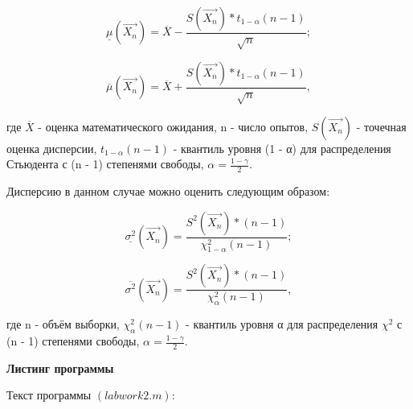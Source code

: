 \documentclass[12pt,a4paper]{scrartcl}
\begin{document}
\begin{equation}\label{eq1.1}
\underline {μ} (\overrightarrow {X_n}) = \overline {X} - \frac {S(\overrightarrow {X_n}) * t_{1-α} (n - 1)} {\sqrt {n}};
\end{equation}

\begin{equation}\label{eq1.2}
\overline {μ} (\overrightarrow {X_n}) = \overline {X} + \frac {S(\overrightarrow {X_n}) * t_{1-α} (n - 1)} {\sqrt {n}},
\end{equation}

где $\overline {X}$ - оценка математического ожидания, n - число опытов, $S(\overrightarrow {X_n})$ - точечная оценка дисперсии, $t_{1-α} (n - 1)$ - квантиль уровня (1 - α) для распределения Стьюдента с (n - 1) степенями свободы, $α = \frac {1 - γ} {2}$.

Дисперсию в данном случае можно оценить следующим образом:

\begin{equation}\label{eq1.3}
\underline {σ^2} (\overrightarrow {X_n}) = \frac {S^2(\overrightarrow {X_n}) * (n - 1)} {χ^2_{1-α}(n - 1)};
\end{equation}

\begin{equation}\label{eq1.4}
\overline {σ^2} (\overrightarrow {X_n}) = \frac {S^2(\overrightarrow {X_n}) * (n - 1)} {χ^2_α(n - 1)},
\end{equation}

где n - объём выборки, $χ^2_α(n - 1)$ - квантиль уровня α для распределения $χ^2$ с (n - 1) степенями свободы, $α = \frac {1 - γ} {2}$.

\newpage
{}
\begin{center}
\textbf {Листинг программы}
\end{center}

Текст программы $(labwork2.m)$:
\end{document}
